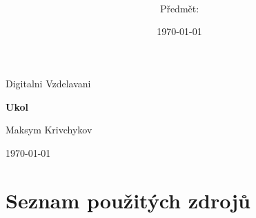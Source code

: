 \documentclass[a4paper,12pt]{article}
\title{\textbf{\nazevPrace}}
\author{\autorPrace \\ \small Předmět: \predmetPrace}
\date{\today}
\newcommand{\nazevPrace}{Ukol}
\newcommand{\autorPrace}{Maksym Krivchykov}
\newcommand{\predmetPrace}{Digitalni Vzdelavani}
\begin{document}
\begin{titlepage}
  \centering
  \vspace*{2cm}
  {\Large \predmetPrace \par}
  \vspace{2.5cm}
  {\Huge \bfseries \nazevPrace \par}
  \vspace{1.5cm}
  {\Large \autorPrace \par}
  \vfill
  {\large \today \par}
\end{titlepage}

\tableofcontents
\newpage



\newpage
\section*{Seznam použitých zdrojů}

\end{document}
